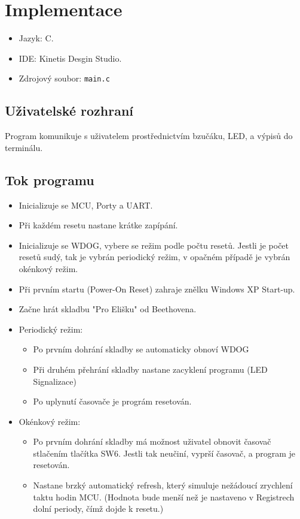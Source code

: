 \documentclass[12pt,a4paper,final]{article}
\begin{document}
\section{Implementace}

\begin{itemize}
    \item Jazyk: C.
    \item IDE: Kinetis Desgin Studio.
    \item Zdrojový soubor: \verb|main.c|
\end{itemize}

\subsection{Uživatelské rozhraní}
Program komunikuje s uživatelem prostřednictvím bzučáku, LED, a výpisů do terminálu.

\subsection{Tok programu}
\begin{itemize}
    \item Inicializuje se MCU, Porty a UART.
    \item Při každém resetu nastane krátke zapípání.
    \item Inicializuje se WDOG, vybere se režim podle počtu resetů. Jestli je počet resetů sudý, tak je vybrán periodický režim, v opačném případě je vybrán okénkový režim.
    \item Při prvním startu (Power-On Reset) zahraje znělku Windows XP Start-up.
    \item Začne hrát skladbu "Pro Elišku"  od Beethovena.
    \item Periodický režim:
    \begin{itemize}
        \item Po prvním dohrání skladby se automaticky obnoví WDOG
        \item Při druhém přehrání skladby nastane zacyklení programu (LED Signalizace)
        \item Po uplynutí časovače je prográm resetován.
    \end{itemize}
    \item Okénkový režim:
    \begin{itemize}
        \item Po prvním dohrání skladby má možnost uživatel obnovit časovač stlačením tlačítka SW6. Jestli tak neučiní, vyprší časovač, a program je resetován.
        \item Nastane brzký automatický refresh, který simuluje nežádoucí zrychlení taktu hodin MCU. (Hodnota bude menší než je nastaveno v Registrech dolní periody, čímž dojde k resetu.)
    \end{itemize} 
\end{itemize}
\end{document}
